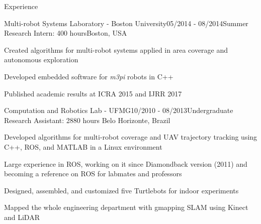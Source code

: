\documentclass[14pt, a4paper]{resume} %
\begin{document}
\begin{rSection}{Experience}

\begin{rSubsection}{Multi-robot Systems Laboratory - Boston University}{05/2014 - 08/2014}{\normalfont Summer Research Intern: 400 hours}{\normalfont Boston,  USA}
	\item Created algorithms for multi-robot systems applied in area coverage and autonomous exploration
	\item Developed embedded software for \textit{m3pi} robots in C++
	\item Published academic results at ICRA 2015 and IJRR 2017	
\end{rSubsection}

\begin{rSubsection}{Computation and Robotics Lab - UFMG}{10/2010 - 08/2013}{\normalfont Undergraduate Research Assistant: 2880 hours}{ \normalfont Belo Horizonte, Brazil}
 	\item Developed algorithms for multi-robot coverage and UAV trajectory tracking using C++, ROS, and MATLAB in a Linux environment 
	\item Large experience in ROS, working on it since Diamondback version (2011) and becoming a reference on ROS for labmates and professors
	\item Designed, assembled, and customized five Turtlebots for indoor experiments
	\item Mapped the whole engineering department with gmapping SLAM using Kinect and LiDAR
\end{rSubsection}
\end{rSection}
\end{document}
